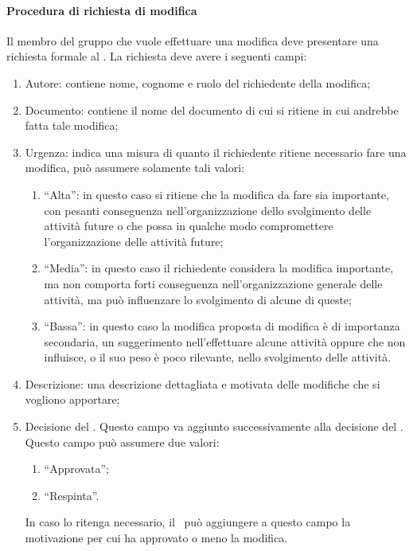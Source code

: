 		\paragraph{Procedura di richiesta di modifica}
		Il membro del gruppo che vuole effettuare una modifica deve presentare una richiesta formale al \responsabilediprogetto. La richiesta deve avere i seguenti campi:
		\begin{enumerate}
			\item Autore: contiene nome, cognome e ruolo del richiedente della modifica;
			\item Documento: contiene il nome del documento di cui si ritiene in cui andrebbe fatta tale modifica;
			\item Urgenza: indica una misura di quanto il richiedente ritiene necessario fare una modifica, può assumere solamente tali valori:
				\begin{enumerate}
					\item ``Alta'': in questo caso si ritiene che la modifica da fare sia importante, con pesanti conseguenza nell'organizzazione dello svolgimento delle attività future o che possa in qualche modo compromettere l'organizzazione delle attività future;
					\item ``Media'': in questo caso il richiedente considera la modifica importante, ma non comporta forti conseguenza nell'organizzazione generale delle attività, ma può influenzare lo svolgimento di alcune di queste;
					\item ``Bassa'': in questo caso la modifica proposta di modifica è di importanza secondaria, un suggerimento nell'effettuare alcune attività oppure che non influisce, o il suo peso è poco rilevante, nello svolgimento delle attività.
				\end{enumerate}
			\item Descrizione: una descrizione dettagliata e motivata delle modifiche che si vogliono apportare;
			\item Decisione del \responsabilediprogetto. Questo campo va aggiunto successivamente alla decisione del \responsabilediprogetto. Questo campo può assumere due valori:
				\begin{enumerate}
					\item ``Approvata'';
					\item ``Respinta''.
				\end{enumerate}
			In caso lo ritenga necessario, il \responsabilediprogetto\ può aggiungere a questo campo la motivazione per cui ha approvato o meno la modifica.
		\end{enumerate}

